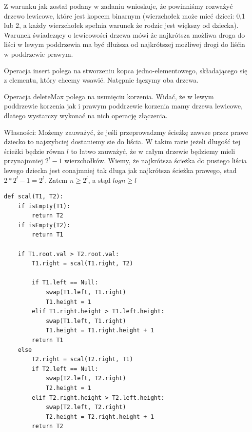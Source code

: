 \documentclass[12pt]{article}
\begin{document}
Z warunku jak został podany w zadaniu wnioskuje, że powinniśmy rozważyć drzewo lewicowe, które jest kopcem binarnym (wierzchołek może mieć dzieci: 0,1 lub 2, a każdy wierzchołek spełnia warunek że rodzic jest większy od dziecka).
Warunek świadczący o lewicowości drzewa mówi że najkrótsza możliwa droga do liści w lewym poddrzewia ma być dłuższa od najkrótszej możliwej drogi do liśćia w poddrzewie prawym.

Operacja insert polega na stworzeniu kopca jedno-elementowego, składającego się z elementu, który chcemy wsawić. Natępnie łączymy oba drzewa.

Operacja deleteMax polega na usunięciu korzenia. Widać, że w lewym poddrzewie korzenia jak i prawym poddrzewie korzenia mamy drzewa lewicowe, dlatego wystarczy wykonać na nich operację złączenia.

Własności:
Możemy zauważyć, że jeśli przeprowadzmy ścieżkę zawsze przez prawe dziecko to najszybciej dostaniemy sie do liścia. W takim razie jeżeli długość tej ścieżki będzie równa $l$ to łatwo zauważyć, że w całym drzewie będziemy mieli przynajmniej $2^l-1$ wierzchołków. Wiemy, że najkrótsza ścieżka do pustego liścia lewego dziecka jest conajmniej tak długa jak najkrótsza ścieżka prawego, stad $2 * 2^l-1 = 2^l$. 
Zatem $n \geq 2^l$, a stąd $log n \geq l$
\begin{lstlisting}
def scal(T1, T2):
    if isEmpty(T1):
        return T2
    if isEmpty(T2):
        return T1
        
    if T1.root.val > T2.root.val:
        T1.right = scal(T1.right, T2)
    
        if T1.left == Null:
            swap(T1.left, T1.right)
            T1.height = 1
        elif T1.right.height > T1.left.height:
            swap(T1.left, T1.right)
            T1.height = T1.right.height + 1
        return T1
    else
        T2.right = scal(T2.right, T1)
        if T2.left == Null:
            swap(T2.left, T2.right)
            T2.height = 1
        elif T2.right.height > T2.left.height:
            swap(T2.left, T2.right)
            T2.height = T2.right.height + 1
        return T2
\end{lstlisting}
\end{document}
